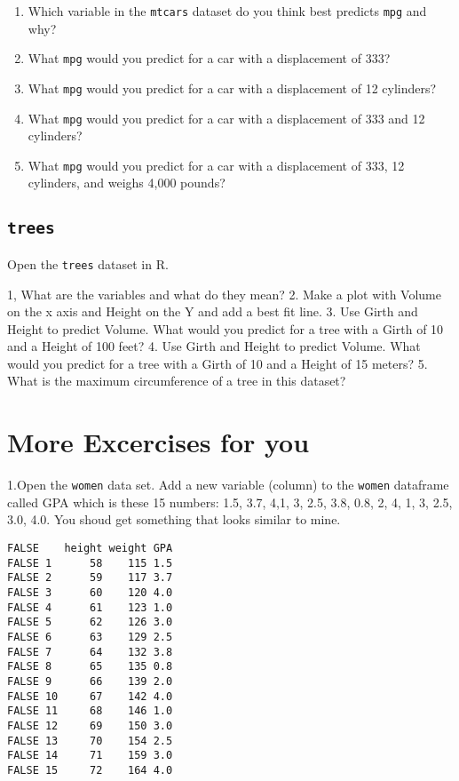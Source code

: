 \documentclass[
]{book}
\providecommand{\tightlist}{%
  \setlength{\itemsep}{0pt}\setlength{\parskip}{0pt}}
\begin{document}
\begin{enumerate}
\def\labelenumi{\arabic{enumi}.}
\tightlist
\item
  Which variable in the \texttt{mtcars} dataset do you think best predicts \texttt{mpg} and why?
\item
  What \texttt{mpg} would you predict for a car with a displacement of 333?
\item
  What \texttt{mpg} would you predict for a car with a displacement of 12 cylinders?
\item
  What \texttt{mpg} would you predict for a car with a displacement of 333 and 12 cylinders?
\item
  What \texttt{mpg} would you predict for a car with a displacement of 333, 12 cylinders, and weighs 4,000 pounds?
\end{enumerate}

\hypertarget{trees}{%
\subsection{\texorpdfstring{\texttt{trees}}{trees}}\label{trees}}

Open the \texttt{trees} dataset in R.

1, What are the variables and what do they mean?
2. Make a plot with Volume on the x axis and Height on the Y and add a best fit line.
3. Use Girth and Height to predict Volume. What would you predict for a tree with a Girth of 10 and a Height of 100 feet?
4. Use Girth and Height to predict Volume. What would you predict for a tree with a Girth of 10 and a Height of 15 meters?
5. What is the maximum circumference of a tree in this dataset?

\hypertarget{more-excercises-for-you}{%
\section{\texorpdfstring{More Excercises for \textbf{you}}{More Excercises for you}}\label{more-excercises-for-you}}

1.Open the \texttt{women} data set. Add a new variable (column) to the \texttt{women} dataframe called GPA which is these 15 numbers: 1.5, 3.7, 4,1, 3, 2.5, 3.8, 0.8, 2, 4, 1, 3, 2.5, 3.0, 4.0. You shoud get something that looks similar to mine.

\begin{verbatim}
FALSE    height weight GPA
FALSE 1      58    115 1.5
FALSE 2      59    117 3.7
FALSE 3      60    120 4.0
FALSE 4      61    123 1.0
FALSE 5      62    126 3.0
FALSE 6      63    129 2.5
FALSE 7      64    132 3.8
FALSE 8      65    135 0.8
FALSE 9      66    139 2.0
FALSE 10     67    142 4.0
FALSE 11     68    146 1.0
FALSE 12     69    150 3.0
FALSE 13     70    154 2.5
FALSE 14     71    159 3.0
FALSE 15     72    164 4.0
\end{verbatim}
\end{document}
